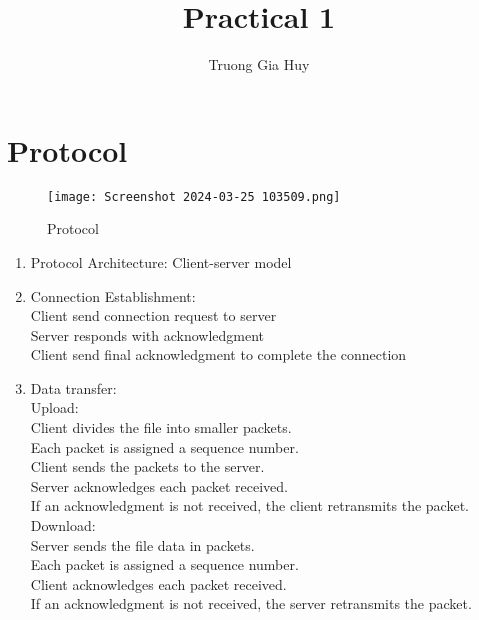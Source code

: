 \documentclass{article}
\title{Practical 1}
\author{Truong Gia Huy}
\begin{document}
\maketitle



\section{Protocol}
\begin{figure}[h!]
    \centering
    \texttt{[image: Screenshot 2024-03-25 103509.png]}
    \caption{Protocol}
    \label{fig:enter-label}
\end{figure}
\begin{enumerate}
    \item Protocol Architecture: Client-server model
    \item Connection Establishment:\\
     Client send connection request to server\\
     Server responds with acknowledgment \\
     Client send final acknowledgment  to complete the connection \\
    \item Data transfer:\\
     Upload:\\
        Client divides the file into smaller packets.\\
        Each packet is assigned a sequence number.\\
        Client sends the packets to the server.\\
        Server acknowledges each packet received.\\
        If an acknowledgment is not received, the client retransmits the packet.\\
     Download:\\
        Server sends the file data in packets.\\
        Each packet is assigned a sequence number.\\
        Client acknowledges each packet received.\\
        If an acknowledgment is not received, the server retransmits the packet.
\end{enumerate}
\end{document}
